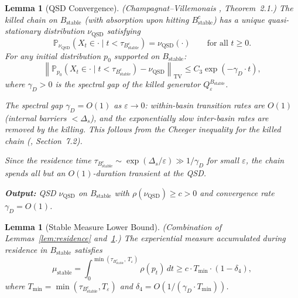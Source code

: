 \documentclass[11pt]{article}
\newtheorem{lemma}[theorem]{Lemma}
\newcommand{\eps}{\varepsilon}
\newcommand{\Ds}{\Delta_s}
\newcommand{\Bstable}{B_{\mathrm{stable}}}
\newcommand{\Teps}{T_\eps}
\newcommand{\TV}{\mathrm{TV}}
\newcommand{\QSD}{\mathrm{QSD}}
\begin{document}
\begin{lemma}[QSD Convergence]\label{lem:qsd}
\textnormal{(Champagnat--Villemonais \cite{CV16}, Theorem~2.1.)}
The killed chain on $\Bstable$ (with absorption upon hitting
$\Bstable^c$) has a unique quasi-stationary distribution $\nu_\QSD$
satisfying
\[
  \mathbb{P}_{\nu_\QSD}(X_t \in \cdot \mid t < \tau_{\Bstable^c})
  = \nu_\QSD(\cdot)
  \qquad \text{for all } t \geq 0.
\]
For any initial distribution $p_0$ supported on $\Bstable$:
\begin{equation}\label{eq:qsd-convergence}
  \left\|\mathbb{P}_{p_0}(X_t \in \cdot \mid t < \tau_{\Bstable^c})
  - \nu_\QSD\right\|_{\TV}
  \leq C_3 \exp(-\gamma_D \cdot t),
\end{equation}
where $\gamma_D > 0$ is the spectral gap of the killed generator
$Q_\eps^{\Bstable}$.

The spectral gap $\gamma_D = O(1)$ as $\eps \to 0$: within-basin
transition rates are $O(1)$ (internal barriers $< \Ds$), and the
exponentially slow inter-basin rates are removed by the killing.
This follows from the Cheeger inequality for the killed chain
(\cite{BdH15}, Section~7.2).

Since the residence time $\tau_{\Bstable^c} \sim \exp(\Ds/\eps)
\gg 1/\gamma_D$ for small $\eps$, the chain spends all but an
$O(1)$-duration transient at the QSD.

\medskip\noindent
\textbf{Output:} QSD $\nu_\QSD$ on $\Bstable$ with
$\rho(\nu_\QSD) \geq c > 0$ and convergence rate
$\gamma_D = O(1)$.
\end{lemma}

\begin{lemma}[Stable Measure Lower Bound]\label{lem:stable-lower}
\textnormal{(Combination of Lemmas~\ref{lem:residence}
and~\ref{lem:qsd}.)}
The experiential measure accumulated during residence in $\Bstable$
satisfies
\begin{equation}\label{eq:mu-stable}
  \mu_{\mathrm{stable}}
  = \int_0^{\min(\tau_{\Bstable^c},\,\Teps)} \rho(p_t)\, dt
  \geq c \cdot T_{\min} \cdot (1 - \delta_4),
\end{equation}
where $T_{\min} = \min(\tau_{\Bstable^c}, \Teps)$ and
$\delta_4 = O(1/(\gamma_D \cdot T_{\min}))$.
\end{lemma}
\end{document}
